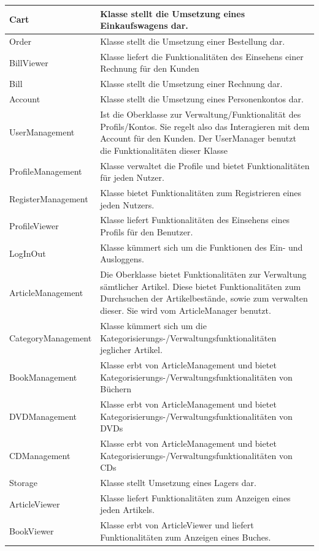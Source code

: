 \documentclass[a4paper]{article}
\begin{document}
\begin{longtable}{|p{100px}|p{250px}|}
	Cart & Klasse stellt die Umsetzung eines Einkaufswagens dar. \\ \hline
	Order & Klasse stellt die Umsetzung einer Bestellung dar. \\ \hline
	BillViewer & Klasse liefert die Funktionalitäten des Einsehens einer Rechnung für den Kunden \\ \hline
	Bill & Klasse stellt die Umsetzung einer Rechnung dar. \\ \hline
	Account	 & Klasse stellt die Umsetzung eines Personenkontos dar. \\ \hline
	UserManagement  & Ist die Oberklasse zur Verwaltung/Funktionalität des Profils/Kontos. Sie regelt also das Interagieren mit dem Account für den Kunden. Der UserManager benutzt die Funktionalitäten dieser Klasse \\ \hline
	ProfileManagement & Klasse verwaltet die Profile und bietet Funktionalitäten für jeden Nutzer. \\ \hline
	RegisterManagement & Klasse bietet Funktionalitäten zum Registrieren eines jeden Nutzers. \\ \hline
	ProfileViewer & Klasse liefert Funktionalitäten des Einsehens eines Profils für den Benutzer. \\ \hline
	LogInOut & Klasse kümmert sich um die Funktionen des Ein- und Ausloggens. \\ \hline
	ArticleManagement & Die Oberklasse bietet Funktionalitäten zur Verwaltung sämtlicher Artikel. Diese bietet Funktionalitäten zum Durchsuchen der Artikelbestände, sowie zum verwalten dieser. Sie wird vom ArticleManager benutzt. \\ \hline
	CategoryManagement & Klasse kümmert sich um die Kategorisierungs-/Verwaltungsfunktionalitäten jeglicher Artikel. \\ \hline
	BookManagement & Klasse erbt von ArticleManagement und  bietet  Kategorisierungs-/Verwaltungsfunktionalitäten von Büchern \\ \hline
	DVDManagement & Klasse erbt von ArticleManagement und  bietet  Kategorisierungs-/Verwaltungsfunktionalitäten von DVDs \\ \hline
	CDManagement & Klasse erbt von ArticleManagement und  bietet  Kategorisierungs-/Verwaltungsfunktionalitäten von CDs \\ \hline
	Storage & Klasse stellt Umsetzung eines Lagers dar. \\ \hline
	ArticleViewer & Klasse liefert Funktionalitäten zum Anzeigen eines jeden Artikels. \\ \hline
	BookViewer & Klasse erbt von ArticleViewer und liefert Funktionalitäten zum Anzeigen eines Buches. \\ \hline

\end{longtable}
\end{document}
